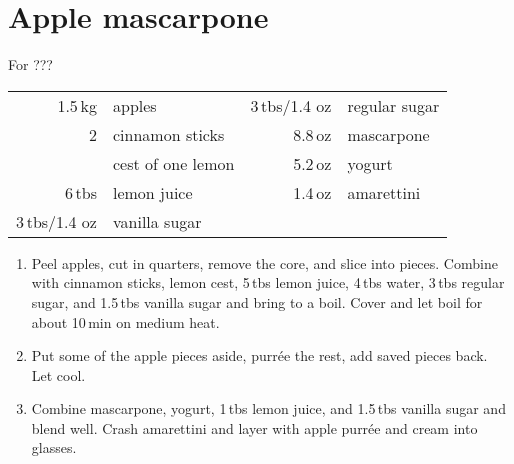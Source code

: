 \section{Apple mascarpone}
\begin{centering}
\end{centering}
For ???
\begin{table}[H]
\centering
\begin{tabular*}{1\textwidth}{rlrl}
1.5\,kg & apples & 3\,tbs/1.4 oz & regular sugar \\
2 & cinnamon sticks & 8.8\,oz & mascarpone \\
& cest of one lemon & 5.2\,oz & yogurt \\
6\,tbs & lemon juice & 1.4\,oz & amarettini \\
3\,tbs/1.4 oz & vanilla sugar & & \\
\end{tabular*}
\end{table}

\begin{enumerate}

\item Peel apples, cut in quarters, remove the core, and slice into pieces. Combine with cinnamon sticks, lemon cest, 5\,tbs lemon juice, 4\,tbs water, 3\,tbs regular sugar, and 1.5\,tbs vanilla sugar and bring to a boil. Cover and let boil for about 10\,min on medium heat.

\item Put some of the apple pieces aside, purr\'{e}e the rest, add saved pieces back. Let cool.

\item Combine mascarpone, yogurt, 1\,tbs lemon juice, and 1.5\,tbs vanilla sugar and blend well. Crash amarettini and layer with apple purr\'{e}e and cream into glasses.
\end{enumerate}

